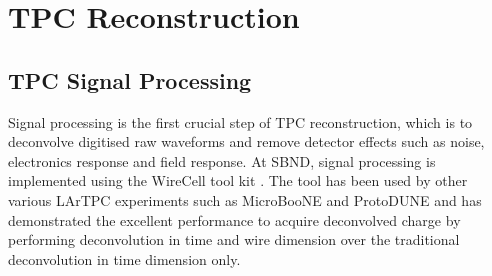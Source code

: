 \section{TPC Reconstruction}
\label{sec:reco_tpc}

\subsection{TPC Signal Processing}
Signal processing is the first crucial step of TPC reconstruction, which is to deconvolve digitised raw waveforms and remove detector effects such as noise, electronics response and field response. 
At SBND, signal processing is implemented using the WireCell tool kit \cite{wirecell}.
The tool has been used by other various LArTPC experiments such as MicroBooNE and ProtoDUNE and has demonstrated the excellent performance to acquire deconvolved charge by performing deconvolution in time and wire dimension over the traditional deconvolution in time dimension only. 

